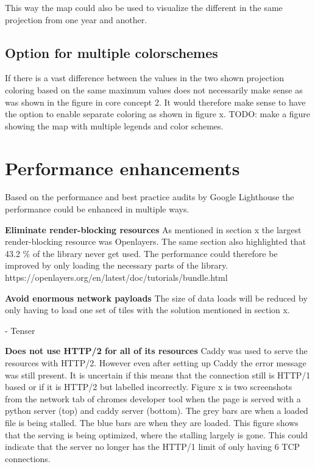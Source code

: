 This way the map could also be used to visualize the different in the same projection from one year and another.
\subsection{Option for multiple colorschemes}
If there is a vast difference between the values in the two shown projection coloring based on the same maximum values does not necessarily make sense as was shown in the figure in core concept 2. It would therefore make sense to have the option to enable separate coloring as shown in figure x. 
TODO: make a figure showing the map with multiple legends and color schemes. 


\section{Performance enhancements}

Based on the performance and best practice audits by Google Lighthouse the performance could be enhanced in multiple ways. 

\textbf{Eliminate render-blocking resources}
As mentioned in section x the largest render-blocking resource was Openlayers. The same section also highlighted that 43.2 \% of the library never get used. The performance could therefore be improved by only loading the necessary parts of the library. 
https://openlayers.org/en/latest/doc/tutorials/bundle.html

\textbf{Avoid enormous network payloads}
The size of data loads will be reduced by only having to load one set of tiles with the solution mentioned in section x. 

-	Tenser 


\textbf{Does not use HTTP/2 for all of its resources}
Caddy was used to serve the resources with HTTP/2. However even after setting up Caddy the error message was still present. It is uncertain if this means that the connection still is HTTP/1 based or if it is HTTP/2 but labelled incorrectly. Figure x is two screenshots from the network tab of chromes developer tool when the page is served with a python server (top) and caddy server (bottom). 
The grey bars are when a loaded file is being stalled. The blue bars are when they are loaded. This figure shows that the serving is being optimized, where the stalling largely is gone. This could indicate that the server no longer has the HTTP/1 limit of only having 6 TCP connections.
 

